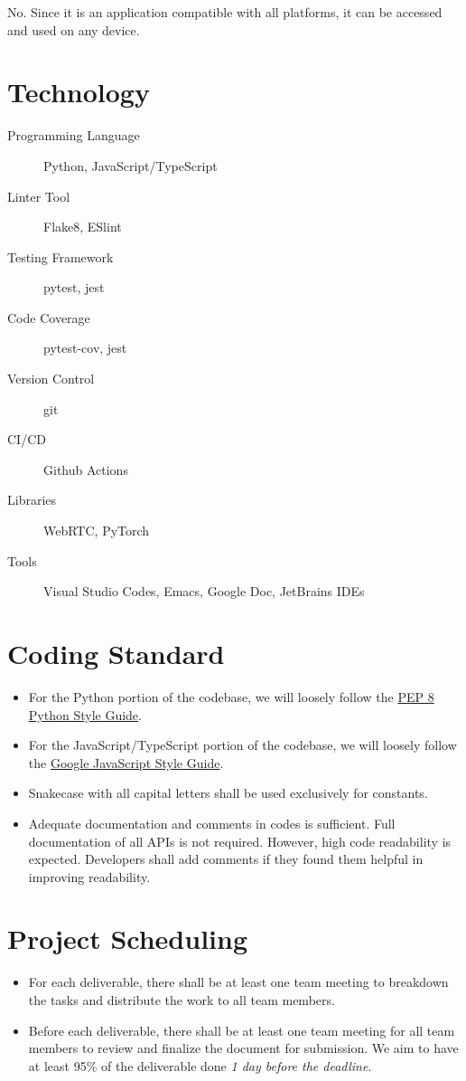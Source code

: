 \documentclass{article}
\begin{document}
No. Since it is an application compatible with all platforms, it can be accessed
and used on any device.

\section{Technology}

\begin{description}
\item[Programming Language] Python, JavaScript/TypeScript
\item[Linter Tool] Flake8, ESlint
\item[Testing Framework] pytest, jest
\item[Code Coverage] pytest-cov, jest
\item[Version Control] git
\item[CI/CD] Github Actions
\item[Libraries] WebRTC, PyTorch
\item[Tools] Visual Studio Codes, Emacs, Google Doc, JetBrains IDEs
\end{description}

\section{Coding Standard}

\begin{itemize}
\item For the Python portion of the codebase, we will loosely follow the
  \href{https://peps.python.org/pep-0008/}{PEP 8 Python Style Guide}.
\item For the JavaScript/TypeScript portion of the codebase, we will loosely follow
  the \href{https://google.github.io/styleguide/jsguide.html}{Google JavaScript
    Style Guide}.
\item Snakecase with all capital letters shall be used exclusively for constants.
\item Adequate documentation and comments in codes is sufficient. Full
  documentation of all APIs is not required. However, high code readability is
  expected. Developers shall add comments if they found them helpful in
  improving readability.
\end{itemize}

\section{Project Scheduling}

\begin{itemize}
\item For each deliverable, there shall be at least one team meeting to breakdown
  the tasks and distribute the work to all team members.
\item Before each deliverable, there shall be at least one team meeting for all
  team members to review and finalize the document for submission. We aim to
  have at least 95\% of the deliverable done \emph{1 day before the deadline}.
\end{itemize}
\end{document}
